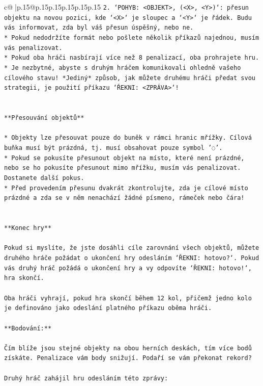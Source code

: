 \documentclass{article}
\begin{document}
{\begin{supertabular}{c@{$\;$}|p{.15\linewidth}@{}p{.15\linewidth}p{.15\linewidth}p{.15\linewidth}p{.15\linewidth}p{.15\linewidth}}
{{{\texttt{2. `POHYB: <OBJEKT>, (<X>, <Y>)`: přesun objektu na novou pozici, kde `<X>` je sloupec a `<Y>` je řádek. Budu vás informovat, zda byl váš přesun úspěšný, nebo ne.} \\
\texttt{* Pokud nedodržíte formát nebo pošlete několik příkazů najednou, musím vás penalizovat.} \\
\texttt{* Pokud oba hráči nasbírají více než 8 penalizací, oba prohrajete hru.} \\
\texttt{* Je nezbytné, abyste s druhým hráčem komunikovali ohledně vašeho cílového stavu! *Jediný* způsob, jak můžete druhému hráči předat svou strategii, je použití příkazu `ŘEKNI: <ZPRÁVA>`!} \\
\\ 
\\ 
\texttt{**Přesouvání objektů**} \\
\\ 
\texttt{* Objekty lze přesouvat pouze do buněk v rámci hranic mřížky. Cílová buňka musí být prázdná, tj. musí obsahovat pouze symbol '◌'.} \\
\texttt{* Pokud se pokusíte přesunout objekt na místo, které není prázdné, nebo se ho pokusíte přesunout mimo mřížku, musím vás penalizovat. Dostanete další pokus.} \\
\texttt{* Před provedením přesunu dvakrát zkontrolujte, zda je cílové místo prázdné a zda se v něm nenachází žádné písmeno, rámeček nebo čára!} \\
\\ 
\\ 
\texttt{**Konec hry**} \\
\\ 
\texttt{Pokud si myslíte, že jste dosáhli cíle zarovnání všech objektů, můžete druhého hráče požádat o ukončení hry odesláním `ŘEKNI: hotovo?`. Pokud vás druhý hráč požádá o ukončení hry a vy odpovíte `ŘEKNI: hotovo!`, hra skončí.} \\
\\ 
\texttt{Oba hráči vyhrají, pokud hra skončí během 12 kol, přičemž jedno kolo je definováno jako odeslání platného příkazu oběma hráči.} \\
\\ 
\texttt{**Bodování:**} \\
\\ 
\texttt{Čím blíže jsou stejné objekty na obou herních deskách, tím více bodů získáte. Penalizace vám body snižují. Podaří se vám překonat rekord?} \\
\\ 
\texttt{Druhý hráč zahájil hru odesláním této zprávy:} \\
}}}
\end{supertabular}}
\end{document}
